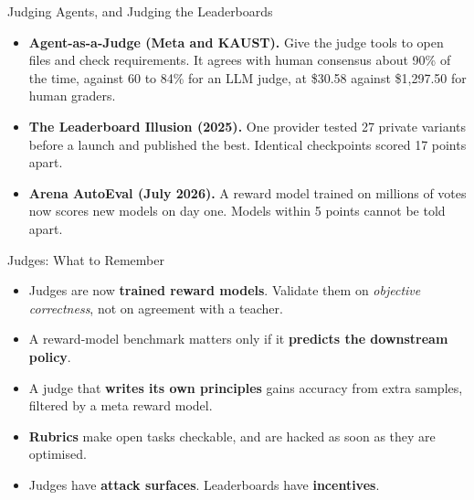 \begin{frame}{Judging Agents, and Judging the Leaderboards}
    \begin{itemize}\itemsep0.4em
        \item \textbf{Agent-as-a-Judge (Meta and KAUST).} Give the judge tools to open files and check requirements. It agrees with human consensus about 90\% of the time, against 60 to 84\% for an LLM judge, at \$30.58 against \$1,297.50 for human graders.
        \item \textbf{The Leaderboard Illusion (2025).} One provider tested 27 private variants before a launch and published the best. Identical checkpoints scored 17 points apart.
        \item \textbf{Arena AutoEval (July 2026).} A reward model trained on millions of votes now scores new models on day one. Models within 5 points cannot be told apart.
    \end{itemize}
\end{frame}

\begin{frame}{Judges: What to Remember}
    \begin{itemize}\itemsep0.55em
        \item Judges are now \textbf{trained reward models}. Validate them on \emph{objective correctness}, not on agreement with a teacher.
        \item A reward-model benchmark matters only if it \textbf{predicts the downstream policy}.
        \item A judge that \textbf{writes its own principles} gains accuracy from extra samples, filtered by a meta reward model.
        \item \textbf{Rubrics} make open tasks checkable, and are hacked as soon as they are optimised.
        \item Judges have \textbf{attack surfaces}. Leaderboards have \textbf{incentives}.
    \end{itemize}
    \vspace{0.4em}
\end{frame}

